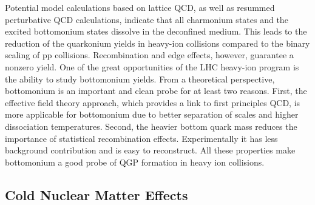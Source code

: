 Potential model calculations based on lattice QCD, as well as resummed 
perturbative QCD calculations, indicate that all charmonium states and the
excited bottomonium states dissolve in the deconfined medium. This leads to 
the reduction of the quarkonium yields in heavy-ion collisions 
compared to the binary scaling of pp collisions. Recombination and edge
effects, however, guarantee a nonzero yield. One of the great opportunities of the 
LHC heavy-ion program is the ability to study bottomonium yields. 
From a theoretical perspective, bottomonium is an important and clean probe 
for at least two reasons. 
First, the effective field theory approach, which provides a link to first 
principles QCD, is more applicable for bottomonium due to better separation of 
scales and higher dissociation temperatures. Second, the heavier bottom quark 
mass reduces the importance of statistical recombination effects.
Experimentally it has less background contribution and is easy to reconstruct. 
All these properties make bottomonium a good probe of 
QGP formation in heavy ion collisions.



              
\subsection{Cold Nuclear Matter Effects}

